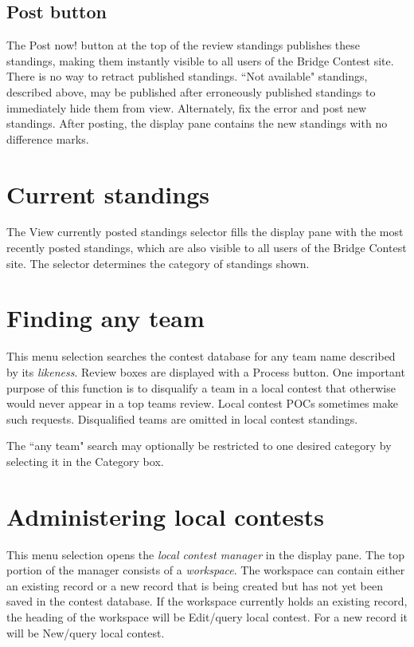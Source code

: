\documentclass[11pt,letterpaper]{refart}
\def\ui#1{\textsf{#1}}
\begin{document}
\subsection{Post button}
The \ui{Post now!} button at the top of the review standings publishes
these standings, making them instantly visible to all users of the
Bridge Contest site. There is no way to retract published standings.
``Not available" standings, described above, may be published after
erroneously published standings to immediately hide them from
view. Alternately, fix the error and post new standings.  After
posting, the display pane contains the new standings with no
difference marks.

\section{Current standings}
The \ui{View currently posted standings} selector fills the display
pane with the most recently posted standings, which are also visible
to all users of the Bridge Contest site. The selector determines the
category of standings shown.

\section{Finding any team}
This menu selection searches the contest database for any team name
described by its \emph{likeness}. Review boxes are displayed with a
\ui{Process} button. One important purpose of this function is to
disqualify a team in a local contest that otherwise would never appear
in a top teams review. Local contest POCs sometimes make such
requests. Disqualified teams are omitted in local contest standings.

The ``any team" search may optionally be restricted to one desired
category by selecting it in the \ui{Category} box.

\section{Administering local contests}
This menu selection opens the \emph{local contest manager} in the
display pane.  The top portion of the manager consists of a
\emph{workspace}. The workspace can contain either an existing record
or a new record that is being created but has not yet been saved in
the contest database. If the workspace currently holds an existing
record, the heading of the workspace will be \ui{Edit/query local
  contest}. For a new record it will be \ui{New/query local contest}.
\end{document}
